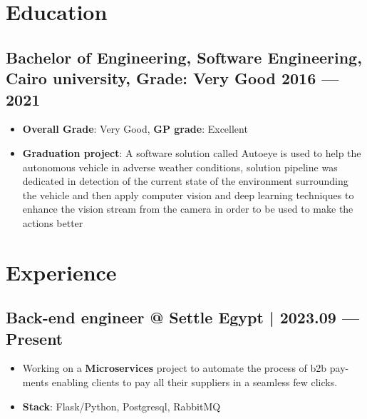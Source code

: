 \documentclass[a4,10pt]{article}
\newenvironment{zitemize}{
\begin{itemize}\itemsep0pt \parskip0pt \parsep1pt}
{\end{itemize}\vspace{-0.5cm}}
\begin{document}
\vspace{-0.2cm}

\section{Education }
\subsection*{Bachelor of Engineering, Software Engineering, {\normalsize \normalfont Cairo university, Grade: Very Good} \hfill 2016 --- 2021} 
\begin{zitemize}
    \item \textbf{Overall Grade}: Very Good, \textbf{GP grade}: Excellent
    \item \textbf{Graduation project}: A software solution called Autoeye is used to help the
        autonomous vehicle in adverse weather conditions, solution pipeline was
        dedicated in detection of the current state of the environment surrounding
        the vehicle and then apply computer vision and deep learning techniques
        to enhance the vision stream from the camera in order to be used to make
        the actions better
\end{zitemize}
\vspace{0.2cm}

\section{Experience}

\subsection*{Back-end engineer @ Settle \hfill Egypt | 2023.09 --- Present} 
    \begin{zitemize}
        \item Working on a \textbf{Microservices} project to automate the process of b2b pay-
        ments enabling clients to pay all their suppliers in a seamless few clicks.
        \item \textbf{Stack}: Flask/Python, Postgresql, RabbitMQ
    \end{zitemize}
\end{document}
